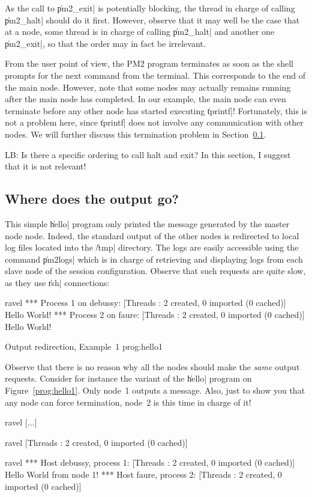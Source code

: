 As the call to \|pm2_exit| is potentially blocking, the thread in
charge of calling \|pm2_halt| should do it first. However, observe
that it may well be the case that at a node, some thread is in charge
of calling \|pm2_halt| and another one \|pm2_exit|, so that the order
may in fact be irrelevant.

From the user point of view, the PM2 program terminates as soon as the
shell prompts for the next command from the terminal. This corresponds
to the end of the main node. However, note that some nodes may
actually remains running after the main node has completed.  In our example,
the main node can even terminate before any other node has started
executing \|tprintf|! Fortunately, this is not a problem here, since
\|tprintf| does not involve any communication with other nodes. We will
further discuss this termination problem in Section~\ref{sec:output}.

\begin{note}
  LB: Is there a specific ordering to call halt and exit? In this
  section, I suggest that it is not relevant!
\end{note}


\subsection{Where does the output go?}
\label{sec:output}

This simple \|hello| program only printed the message generated by the
master node node. Indeed, the standard output of the other nodes is
redirected to local log files located into the \|/tmp| directory.  The
logs are easily accessible using the command \|pm2logs| which is in
charge of retrieving and displaying logs from each slave node of the
session configuration. Observe that such requests are quite slow, as
they use \|rsh| connections:
\begin{shell}
ravel%
*** Process 1 on debussy:
[Threads : 2 created, 0 imported (0 cached)]
Hello World!
*** Process 2 on faure:
[Threads : 2 created, 0 imported (0 cached)]
Hello World!
\end{shell}

 {Output redirection,
  Example~1} {prog:hello1}

Observe that there is no reason why all the nodes should make the
\emph{same} output requests. Consider for instance the variant of the
\|hello| program on Figure~\ref{prog:hello1}. Only node~1 outputs a
message.  Also, just to show you that any node can force termination,
node~2 is this time in charge of it!
\begin{shell}
ravel%
[...]

ravel%
[Threads : 2 created, 0 imported (0 cached)]

ravel%
*** Host debussy, process 1:
[Threads : 2 created, 0 imported (0 cached)]
Hello World from node 1!
*** Host faure, process 2:
[Threads : 2 created, 0 imported (0 cached)]
\end{shell}

